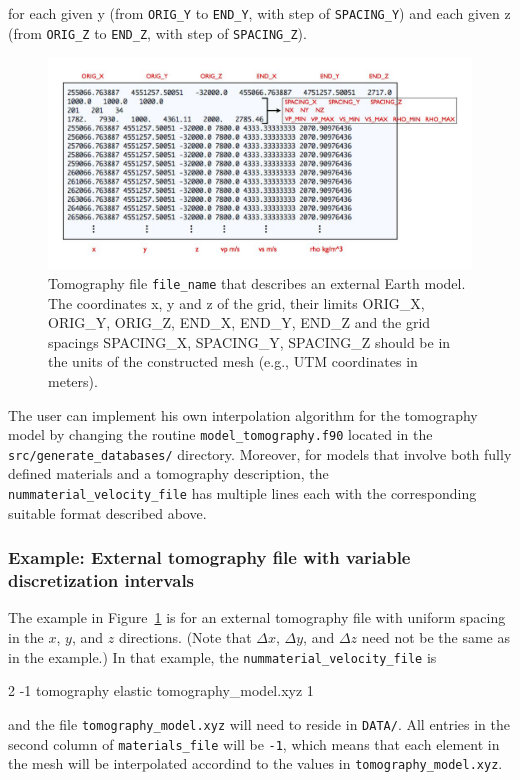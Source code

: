 for each given y (from \texttt{ORIG\_Y} to \texttt{END\_Y}, with step
of \texttt{SPACING\_Y}) and each given z (from \texttt{ORIG\_Z} to
\texttt{END\_Z}, with step of \texttt{SPACING\_Z}). %
\begin{figure}[htbp]
\noindent \begin{centering}
\includegraphics[width=1\textwidth]{figures/tomo_file.jpg}
\par\end{centering}

\caption{Tomography file \texttt{file\_name} that describes an external Earth
model. The coordinates x, y and z of the grid, their limits ORIG\_X,
ORIG\_Y, ORIG\_Z, END\_X, END\_Y, END\_Z and the grid spacings SPACING\_X,
SPACING\_Y, SPACING\_Z should be in the units of the constructed mesh
(e.g., UTM coordinates in meters).}


\label{fig:tomography_file}
\end{figure}


The user can implement his own interpolation algorithm for the tomography
model by changing the routine \texttt{model\_tomography.f90} located
in the \texttt{src/generate\_databases/} directory. Moreover, for
models that involve both fully defined materials and a tomography
description, the \texttt{nummaterial\_velocity\_file} has multiple
lines each with the corresponding suitable format described above.


\subsubsection*{Example: External tomography file with variable discretization intervals}

The example in Figure~\ref{fig:tomography_file} is for an external tomography file with uniform spacing in the $x$, $y$, and $z$ directions. (Note that $\Delta x$, $\Delta y$, and $\Delta z$ need not be the same as in the example.) In that example, the  \texttt{nummaterial\_velocity\_file} is
%
\begin{lyxcode}
2  -1 tomography elastic tomography\_model.xyz 1
\end{lyxcode}
%
and the file \texttt{tomography\_model.xyz} will need to reside in \texttt{DATA/}. All entries in the second column of \texttt{materials\_file} will be \texttt{-1}, which means that each element in the mesh will be interpolated accordind to the values in \texttt{tomography\_model.xyz}.

